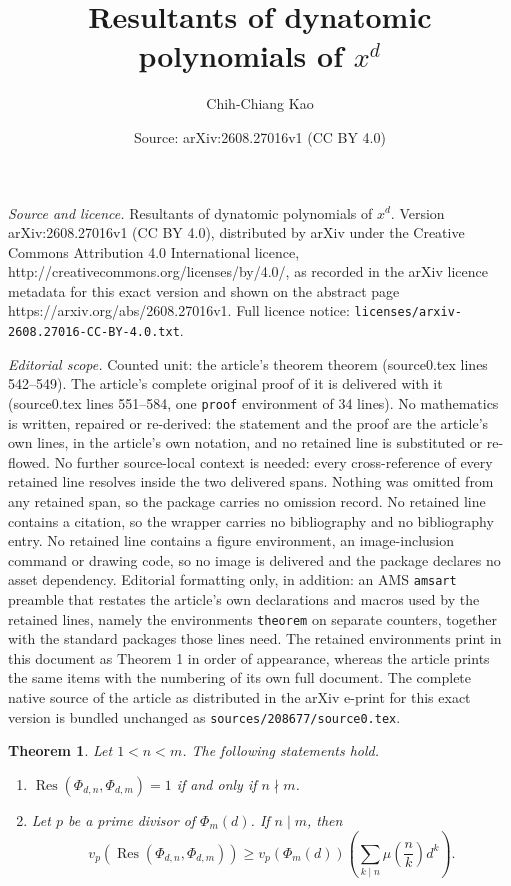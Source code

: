 \documentclass[10pt,a4paper]{amsart}
\title{Resultants of dynatomic polynomials of $x^d$}
\author{Chih-Chiang Kao}
\date{Source: arXiv:2608.27016v1 (CC BY 4.0)}
\newtheorem{theorem}{Theorem}
\newcommand{\res}{\operatorname{Res}}
\begin{document}
\maketitle

\noindent\emph{Source and licence.} Resultants of dynatomic polynomials of $x^d$. Version arXiv:2608.27016v1 (CC BY 4.0), distributed by arXiv under the Creative Commons Attribution 4.0 International licence, http://creativecommons.org/licenses/by/4.0/, as recorded in the arXiv licence metadata for this exact version and shown on the abstract page https://arxiv.org/abs/2608.27016v1. Full licence notice: \texttt{licenses/arxiv-2608.27016-CC-BY-4.0.txt}.\par\smallskip

\noindent\textit{Editorial scope.} Counted unit: the article's theorem theorem (source0.tex lines 542--549). The article's complete original proof of it is delivered with it (source0.tex lines 551--584, one \texttt{proof} environment of 34 lines). No mathematics is written, repaired or re-derived: the statement and the proof are the article's own lines, in the article's own notation, and no retained line is substituted or re-flowed.  No further source-local context is needed: every cross-reference of every retained line resolves inside the two delivered spans.  Nothing was omitted from any retained span, so the package carries no omission record.  No retained line contains a citation, so the wrapper carries no bibliography and no bibliography entry.  No retained line contains a figure environment, an image-inclusion command or drawing code, so no image is delivered and the package declares no asset dependency.  Editorial formatting only, in addition: an AMS \texttt{amsart} preamble that restates the article's own declarations and macros used by the retained lines, namely the environments \texttt{theorem} on separate counters, together with the standard packages those lines need.  The retained environments print in this document as Theorem 1 in order of appearance, whereas the article prints the same items with the numbering of its own full document.  The complete native source of the article as distributed in the arXiv e-print for this exact version is bundled unchanged as \texttt{sources/208677/source0.tex}.
\begin{theorem}
    Let $1<n<m$. The following statements hold. 
    \begin{enumerate}
        \item $\res(\Phi_{d,n},\Phi_{d,m}) = 1$ if and only if $n\nmid m$.
        \item Let $p$ be a prime divisor of $\Phi_{m}(d)$. If $n\mid m$, then
        $$v_p(\res(\Phi_{d,n},\Phi_{d,m}))\geq v_p(\Phi_m(d))\left(\sum_{k\mid n}\mu\left(\frac{n}{k}\right)d^k\right).$$
    \end{enumerate}
\end{theorem}
\end{document}
